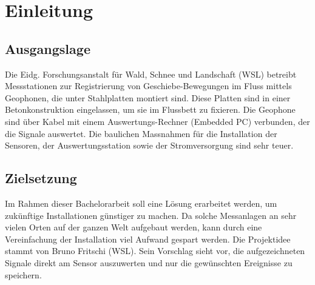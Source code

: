 %
%

\chapter{Einleitung}\label{chap.einleitung}



\section{Ausgangslage}\label{sec.ausgangslage}
Die Eidg. Forschungsanstalt für Wald, Schnee und Landschaft (WSL) betreibt Messstationen zur Registrierung von Geschiebe-Bewegungen im Fluss mittels Geophonen, die unter Stahlplatten montiert sind. Diese Platten sind in einer Betonkonstruktion eingelassen, um sie im Flussbett zu fixieren. Die Geophone sind über Kabel mit einem Auswertungs-Rechner (Embedded PC) verbunden, der die Signale auswertet. Die baulichen Massnahmen für die Installation der Sensoren, der Auswertungsstation sowie der Stromversorgung sind sehr teuer. 


\section{Zielsetzung}\label{sec.zielsetzung}
Im Rahmen dieser Bachelorarbeit soll eine Lösung erarbeitet werden, um zukünftige Installationen günstiger zu machen. Da solche Messanlagen an sehr vielen Orten auf der ganzen Welt aufgebaut werden, kann durch eine Vereinfachung der Installation viel Aufwand gespart werden. Die Projektidee stammt von Bruno Fritschi (WSL). Sein Vorschlag sieht vor, die aufgezeichneten Signale direkt am Sensor auszuwerten und nur die gewünschten Ereignisse zu speichern.

